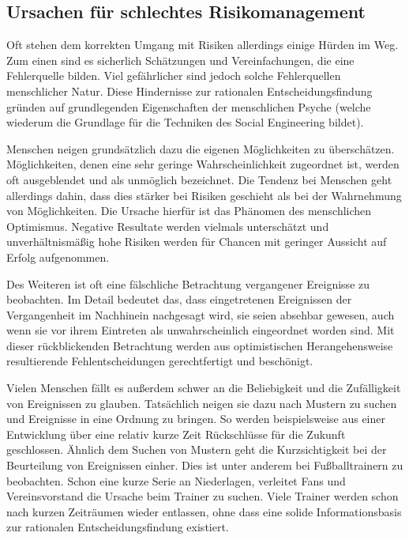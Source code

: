\cite{risikomanagement}

\subsection{Ursachen für schlechtes Risikomanagement}\label{sec:ursachen}
Oft stehen dem korrekten Umgang mit Risiken allerdings einige Hürden im Weg. Zum einen sind es sicherlich Schätzungen und Vereinfachungen, die eine Fehlerquelle bilden. Viel gefährlicher sind jedoch solche Fehlerquellen menschlicher Natur. Diese Hindernisse zur rationalen Entscheidungsfindung gründen auf grundlegenden Eigenschaften der menschlichen Psyche (welche wiederum die Grundlage für die Techniken des Social Engineering bildet).

Menschen neigen grundsätzlich dazu die eigenen Möglichkeiten zu überschätzen.
Möglichkeiten, denen eine sehr geringe Wahrscheinlichkeit zugeordnet ist, werden oft ausgeblendet und
als unmöglich bezeichnet.
Die Tendenz bei Menschen geht allerdings dahin, dass dies stärker bei Risiken geschieht als bei der
Wahrnehmung von Möglichkeiten.
Die Ursache hierfür ist das Phänomen des menschlichen Optimismus.
Negative Resultate werden vielmals unterschätzt und unverhältnismäßig hohe Risiken werden für Chancen
mit geringer Aussicht auf Erfolg aufgenommen.

Des Weiteren ist oft eine fälschliche Betrachtung vergangener Ereignisse zu beobachten.
Im Detail bedeutet das, dass eingetretenen Ereignissen der Vergangenheit im Nachhinein nachgesagt
wird, sie seien absehbar gewesen, auch wenn sie vor ihrem Eintreten als unwahrscheinlich eingeordnet
worden sind.
Mit dieser rückblickenden Betrachtung werden aus optimistischen Herangehensweise resultierende
Fehlentscheidungen gerechtfertigt und beschönigt.

Vielen Menschen fällt es außerdem schwer an die Beliebigkeit und die Zufälligkeit von Ereignissen zu
glauben.
Tatsächlich neigen sie dazu nach Mustern zu suchen und Ereignisse in eine Ordnung zu bringen.
So werden beispielsweise aus einer Entwicklung über eine relativ kurze Zeit Rückschlüsse für die Zukunft geschlossen.
Ähnlich dem Suchen von Mustern geht die Kurzsichtigkeit bei der Beurteilung von Ereignissen einher.
Dies ist unter anderem bei Fußballtrainern zu beobachten.
Schon eine kurze Serie an Niederlagen, verleitet Fans und Vereinsvorstand die Ursache beim Trainer zu
suchen.
Viele Trainer werden schon nach kurzen Zeiträumen wieder entlassen, ohne dass eine solide
Informationsbasis zur rationalen Entscheidungsfindung existiert.

